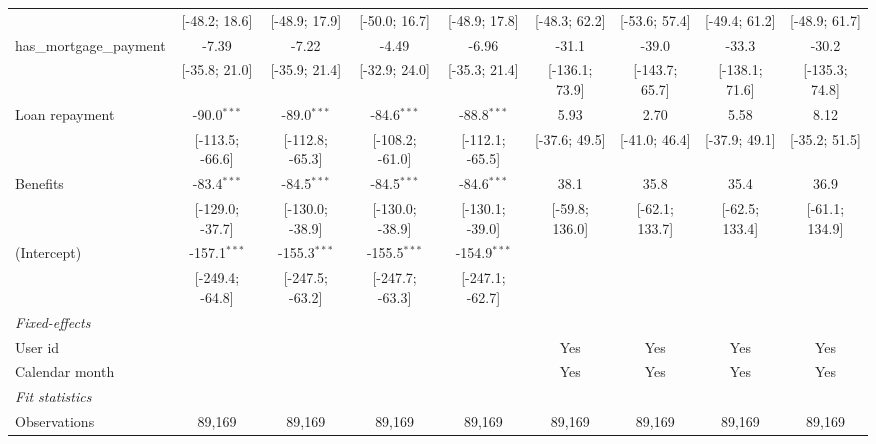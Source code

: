 \begin{table}[htbp]
\begin{threeparttable}[b]
\begin{tabular}{lcccccccc}
                                  & [-48.2; 18.6]   & [-48.9; 17.9]   & [-50.0; 16.7]   & [-48.9; 17.8]   & [-48.3; 62.2]   & [-53.6; 57.4]   & [-49.4; 61.2]   & [-48.9; 61.7]\\   
         has\_mortgage\_payment   & -7.39           & -7.22           & -4.49           & -6.96           & -31.1           & -39.0           & -33.3           & -30.2\\   
                                  & [-35.8; 21.0]   & [-35.9; 21.4]   & [-32.9; 24.0]   & [-35.3; 21.4]   & [-136.1; 73.9]  & [-143.7; 65.7]  & [-138.1; 71.6]  & [-135.3; 74.8]\\   
         Loan repayment           & -90.0$^{***}$   & -89.0$^{***}$   & -84.6$^{***}$   & -88.8$^{***}$   & 5.93            & 2.70            & 5.58            & 8.12\\   
                                  & [-113.5; -66.6] & [-112.8; -65.3] & [-108.2; -61.0] & [-112.1; -65.5] & [-37.6; 49.5]   & [-41.0; 46.4]   & [-37.9; 49.1]   & [-35.2; 51.5]\\   
         Benefits                 & -83.4$^{***}$   & -84.5$^{***}$   & -84.5$^{***}$   & -84.6$^{***}$   & 38.1            & 35.8            & 35.4            & 36.9\\   
                                  & [-129.0; -37.7] & [-130.0; -38.9] & [-130.0; -38.9] & [-130.1; -39.0] & [-59.8; 136.0]  & [-62.1; 133.7]  & [-62.5; 133.4]  & [-61.1; 134.9]\\   
         (Intercept)              & -157.1$^{***}$  & -155.3$^{***}$  & -155.5$^{***}$  & -154.9$^{***}$  &                 &                 &                 &   \\   
                                  & [-249.4; -64.8] & [-247.5; -63.2] & [-247.7; -63.3] & [-247.1; -62.7] &                 &                 &                 &   \\   
         \midrule
         \emph{Fixed-effects}\\
         User id                  &                 &                 &                 &                 & Yes             & Yes             & Yes             & Yes\\  
         Calendar month           &                 &                 &                 &                 & Yes             & Yes             & Yes             & Yes\\  
         \midrule
         \emph{Fit statistics}\\
         Observations             & 89,169          & 89,169          & 89,169          & 89,169          & 89,169          & 89,169          & 89,169          & 89,169\\  

\end{tabular}
\end{threeparttable}
\end{table}
